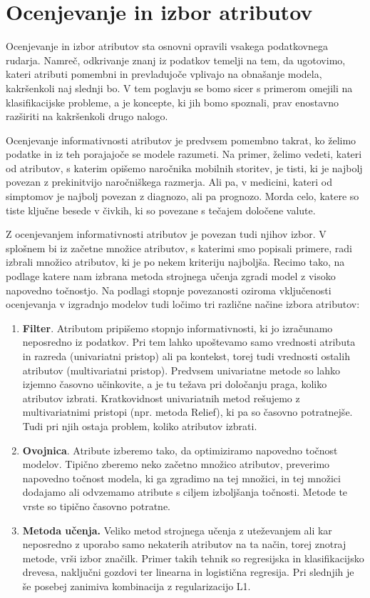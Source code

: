 \chapter{Ocenjevanje in izbor atributov}

Ocenjevanje in izbor atributov sta osnovni opravili vsakega podatkovnega rudarja. Namreč, odkrivanje znanj iz podatkov temelji na tem, da ugotovimo, kateri atributi pomembni in prevladujoče vplivajo na obnašanje modela, kakršenkoli naj slednji bo. V tem poglavju se bomo sicer s primerom omejili na klasifikacijske probleme, a je koncepte, ki jih bomo spoznali, prav enostavno razširiti na kakršenkoli drugo nalogo.

Ocenjevanje informativnosti atributov je predvsem pomembno takrat, ko želimo podatke in iz teh porajajoče se modele razumeti. Na primer, želimo vedeti, kateri od atributov, s katerim opišemo naročnika mobilnih storitev, je tisti, ki je najbolj povezan z prekinitvijo naročniškega razmerja. Ali pa, v medicini, kateri od simptomov je najbolj povezan z diagnozo, ali pa prognozo. Morda celo, katere so tiste ključne besede v čivkih, ki so povezane s tečajem določene valute.

Z ocenjevanjem informativnosti atributov je povezan tudi njihov izbor. V splošnem bi iz začetne množice atributov, s katerimi smo popisali primere, radi izbrali množico atributov, ki je po nekem kriteriju najboljša. Recimo tako, na podlage katere nam izbrana metoda strojnega učenja zgradi model z visoko napovedno točnostjo. Na podlagi stopnje povezanosti oziroma vključenosti ocenjevanja v izgradnjo modelov tudi ločimo tri različne načine izbora atributov:
%
\begin{enumerate}
\item {\bf Filter}. Atributom pripišemo stopnjo informativnosti, ki jo izračunamo neposredno iz podatkov. Pri tem lahko upoštevamo samo vrednosti atributa in razreda (univariatni pristop) ali pa kontekst, torej tudi vrednosti ostalih atributov (multivariatni pristop). Predvsem univariatne metode so lahko izjemno časovno učinkovite, a je tu težava pri določanju praga, koliko atributov izbrati. Kratkovidnost univariatnih metod rešujemo z multivariatnimi pristopi (npr. metoda Relief), ki pa so časovno potratnejše. Tudi pri njih ostaja problem, koliko atributov izbrati.
\item {\bf Ovojnica}. Atribute izberemo tako, da optimiziramo napovedno točnost modelov. Tipično zberemo neko začetno množico atributov, preverimo napovedno točnost modela, ki ga zgradimo na tej množici, in tej množici dodajamo ali odvzemamo atribute s ciljem izboljšanja točnosti. Metode te vrste so tipično časovno potratne.
\item {\bf Metoda učenja.} Veliko metod strojnega učenja z uteževanjem ali kar neposredno z uporabo samo nekaterih atributov na ta način, torej znotraj metode, vrši izbor značilk. Primer takih tehnik so regresijska in klasifikacijsko drevesa, naključni gozdovi ter linearna in logistična regresija. Pri slednjih je še posebej zanimiva kombinacija z regularizacijo L1.
\end{enumerate}

